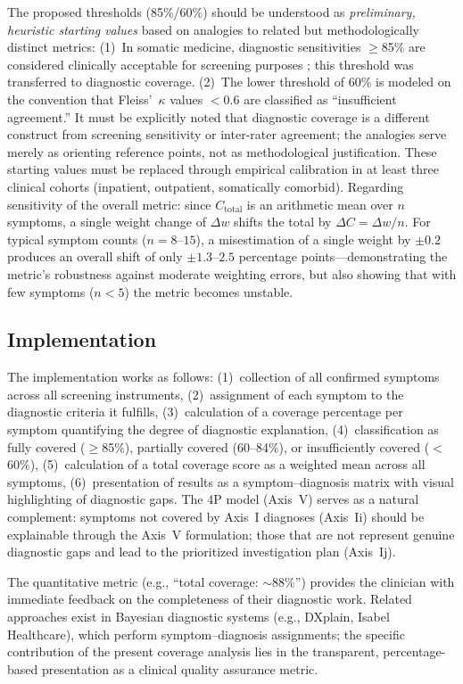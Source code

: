 \documentclass[11pt,a4paper]{article}
\begin{document}
The proposed thresholds (85\%/60\%) should be understood as \textit{preliminary, heuristic starting values} based on analogies to related but methodologically distinct metrics: (1)~In somatic medicine, diagnostic sensitivities $\geq$85\% are considered clinically acceptable for screening purposes \citep{Levis2019}; this threshold was transferred to diagnostic coverage. (2)~The lower threshold of 60\% is modeled on the convention that Fleiss'~$\kappa$ values $<$0.6 are classified as ``insufficient agreement.'' It must be explicitly noted that diagnostic coverage is a different construct from screening sensitivity or inter-rater agreement; the analogies serve merely as orienting reference points, not as methodological justification. These starting values must be replaced through empirical calibration in at least three clinical cohorts (inpatient, outpatient, somatically comorbid). Regarding sensitivity of the overall metric: since $C_{\text{total}}$ is an arithmetic mean over $n$ symptoms, a single weight change of $\Delta w$ shifts the total by $\Delta C = \Delta w / n$. For typical symptom counts ($n = 8$--$15$), a misestimation of a single weight by $\pm 0.2$ produces an overall shift of only $\pm 1.3$--$2.5$ percentage points---demonstrating the metric's robustness against moderate weighting errors, but also showing that with few symptoms ($n < 5$) the metric becomes unstable.

\subsection{Implementation}

The implementation works as follows: (1)~collection of all confirmed symptoms across all screening instruments, (2)~assignment of each symptom to the diagnostic criteria it fulfills, (3)~calculation of a coverage percentage per symptom quantifying the degree of diagnostic explanation, (4)~classification as fully covered ($\geq$85\%), partially covered (60--84\%), or insufficiently covered ($<$60\%), (5)~calculation of a total coverage score as a weighted mean across all symptoms, (6)~presentation of results as a symptom--diagnosis matrix with visual highlighting of diagnostic gaps. The 4P model (Axis~V) serves as a natural complement: symptoms not covered by Axis~I diagnoses (Axis~Ii) should be explainable through the Axis~V formulation; those that are not represent genuine diagnostic gaps and lead to the prioritized investigation plan (Axis~Ij).

The quantitative metric (e.g., ``total coverage: $\sim$88\%'') provides the clinician with immediate feedback on the completeness of their diagnostic work. Related approaches exist in Bayesian diagnostic systems (e.g., DXplain, Isabel Healthcare), which perform symptom--diagnosis assignments; the specific contribution of the present coverage analysis lies in the transparent, percentage-based presentation as a clinical quality assurance metric.
\end{document}

